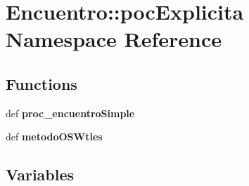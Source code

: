 \section{\-Encuentro\-:\-:poc\-Explicita \-Namespace \-Reference}
\label{namespace_encuentro_1_1poc_explicita}
\subsection*{\-Functions}
\begin{DoxyCompactItemize}
\item 
def {\bf proc\-\_\-encuentro\-Simple}
\item 
def {\bf metodo\-O\-S\-Wtles}
\end{DoxyCompactItemize}
\subsection*{\-Variables}
